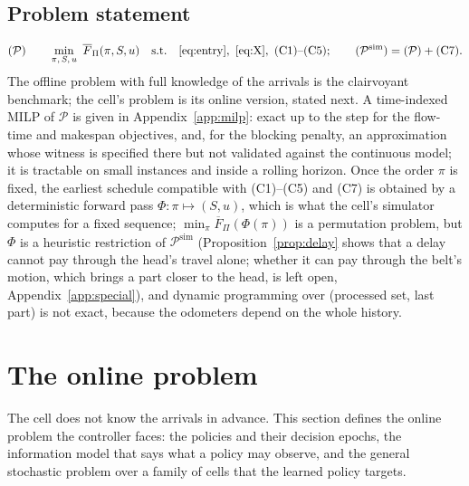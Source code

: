 \documentclass[11pt,a4paper]{article}
\theoremstyle{plain}
\theoremstyle{definition}
\theoremstyle{remark}
\newcommand{\Pb}{\mathcal{P}}
\newcommand{\Psim}{\Pb^{\mathrm{sim}}}
\newcommand{\Fpi}{\overline F_\Pi}
\begin{document}
\subsection{Problem statement}
\begin{equation}\label{eq:P}
(\Pb)\qquad \min_{\pi,\,S,\,u}\ \Fpi(\pi,S,u)\quad\text{s.t.}\quad
\eqref{eq:entry},\ \eqref{eq:X},\ \text{(C1)--(C5)};\qquad
(\Psim)=(\Pb)+\text{(C7)}.
\end{equation}
The offline problem with full knowledge of the arrivals is the clairvoyant benchmark; the
cell's problem is its online version, stated next. A time-indexed MILP of $\Pb$ is given
in Appendix~\ref{app:milp}: exact up to the step for the flow-time and makespan
objectives, and, for the blocking penalty, an approximation whose witness is specified
there but not validated against the continuous model; it is tractable on small instances
and inside a rolling horizon. Once the order $\pi$ is fixed,
the earliest schedule compatible with (C1)--(C5) and (C7) is obtained by a deterministic
forward pass $\Phi:\pi\mapsto(S,u)$, which is what the cell's simulator computes for a
fixed sequence; $\min_\pi\Fpi(\Phi(\pi))$ is a permutation problem, but $\Phi$ is a
heuristic restriction of $\Psim$ (Proposition~\ref{prop:delay} shows that a delay cannot
pay through the head's travel alone; whether it can pay through the belt's motion, which
brings a part closer to the head, is left open, Appendix~\ref{app:special}), and dynamic programming over (processed set, last part) is not
exact, because the odometers depend on the whole history.

\section{The online problem}\label{sec:online}

The cell does not know the arrivals in advance. This section defines the online problem the controller faces: the policies and their decision epochs, the information model that says what a policy may observe, and the general stochastic problem over a family of cells that the learned policy targets.
\end{document}
